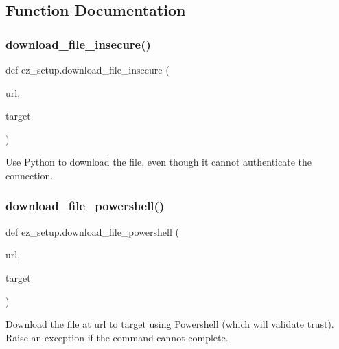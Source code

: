 \subsection{Function Documentation}
\mbox{\label{namespaceez__setup_a77f73fd049bccd9c8b10f5be6ef16ed1}} 
\subsubsection{\texorpdfstring{download\+\_\+file\+\_\+insecure()}{download\_file\_insecure()}}
{\footnotesize\ttfamily def ez\+\_\+setup.\+download\+\_\+file\+\_\+insecure (\begin{DoxyParamCaption}\item[{}]{url,  }\item[{}]{target }\end{DoxyParamCaption})}

\begin{DoxyVerb}Use Python to download the file, even though it cannot authenticate the
connection.
\end{DoxyVerb}
 \mbox{\label{namespaceez__setup_a545d9bb16a7c1509aeb0af7ff5c63a70}} 
\subsubsection{\texorpdfstring{download\+\_\+file\+\_\+powershell()}{download\_file\_powershell()}}
{\footnotesize\ttfamily def ez\+\_\+setup.\+download\+\_\+file\+\_\+powershell (\begin{DoxyParamCaption}\item[{}]{url,  }\item[{}]{target }\end{DoxyParamCaption})}

\begin{DoxyVerb}Download the file at url to target using Powershell (which will validate
trust). Raise an exception if the command cannot complete.
\end{DoxyVerb}
 \mbox{\label{namespaceez__setup_ad41db6464296e12f487740425f92091d}} 
